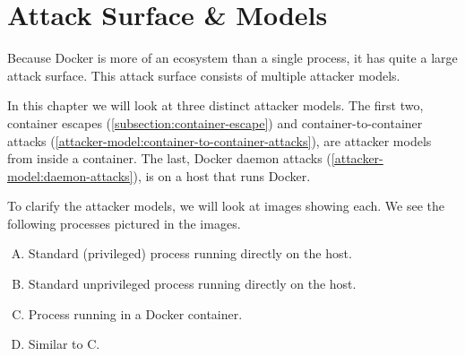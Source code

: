 \chapter{Attack Surface \& Models}\label{chapter:attack-surface-models}
Because Docker is more of an ecosystem than a single process, it has quite a large attack surface. This attack surface consists of multiple attacker models.

In this chapter we will look at three distinct attacker models. The first two, container escapes (\autoref{subsection:container-escape}) and container-to-container attacks (\autoref{attacker-model:container-to-container-attacks}), are attacker models from inside a container. The last, Docker daemon attacks (\autoref{attacker-model:daemon-attacks}), is on a host that runs Docker.

\medskip

To clarify the attacker models, we will look at images showing each. We see the following processes pictured in the images.
\begin{enumerate}[A.]
    \item Standard (privileged) process running directly on the host.
    \item Standard unprivileged process running directly on the host.
    \item Process running in a Docker container.
    \item Similar to C.
\end{enumerate}




